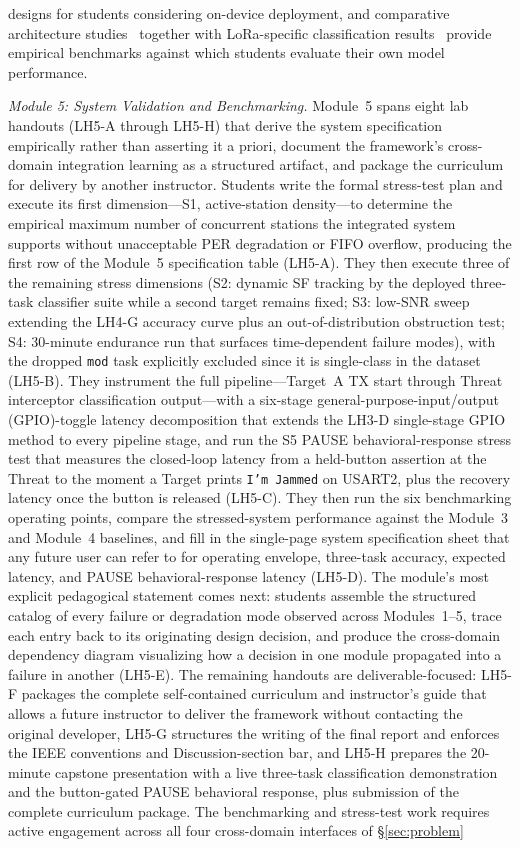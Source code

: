 \documentclass[conference]{IEEEtran}
\begin{document}
designs for students considering on-device deployment, and comparative architecture studies~\cite{b4} together with LoRa-specific classification results~\cite{b5,b6,b8} provide empirical benchmarks against which students evaluate their own model performance.

\textit{Module 5: System Validation and Benchmarking.} Module~5 spans eight lab handouts (LH5-A through LH5-H) that derive the system specification empirically rather than asserting it a priori, document the framework's cross-domain integration learning as a structured artifact, and package the curriculum for delivery by another instructor. Students write the formal stress-test plan and execute its first dimension---S1, active-station density---to determine the empirical maximum number of concurrent stations the integrated system supports without unacceptable PER degradation or FIFO overflow, producing the first row of the Module~5 specification table (LH5-A). They then execute three of the remaining stress dimensions (S2: dynamic SF tracking by the deployed three-task classifier suite while a second target remains fixed; S3: low-SNR sweep extending the LH4-G accuracy curve plus an out-of-distribution obstruction test; S4: 30-minute endurance run that surfaces time-dependent failure modes), with the dropped \texttt{mod} task explicitly excluded since it is single-class in the dataset (LH5-B). They instrument the full pipeline---Target~A TX start through Threat interceptor classification output---with a six-stage general-purpose-input/output (GPIO)-toggle latency decomposition that extends the LH3-D single-stage GPIO method to every pipeline stage, and run the S5 PAUSE behavioral-response stress test that measures the closed-loop latency from a held-button assertion at the Threat to the moment a Target prints \texttt{I'm Jammed} on USART2, plus the recovery latency once the button is released (LH5-C). They then run the six benchmarking operating points, compare the stressed-system performance against the Module~3 and Module~4 baselines, and fill in the single-page system specification sheet that any future user can refer to for operating envelope, three-task accuracy, expected latency, and PAUSE behavioral-response latency (LH5-D). The module's most explicit pedagogical statement comes next: students assemble the structured catalog of every failure or degradation mode observed across Modules~1--5, trace each entry back to its originating design decision, and produce the cross-domain dependency diagram visualizing how a decision in one module propagated into a failure in another (LH5-E). The remaining handouts are deliverable-focused: LH5-F packages the complete self-contained curriculum and instructor's guide that allows a future instructor to deliver the framework without contacting the original developer, LH5-G structures the writing of the final report and enforces the IEEE conventions and Discussion-section bar, and LH5-H prepares the 20-minute capstone presentation with a live three-task classification demonstration and the button-gated PAUSE behavioral response, plus submission of the complete curriculum package. The benchmarking and stress-test work requires active engagement across all four cross-domain interfaces of \S\ref{sec:problem} 
\end{document}
